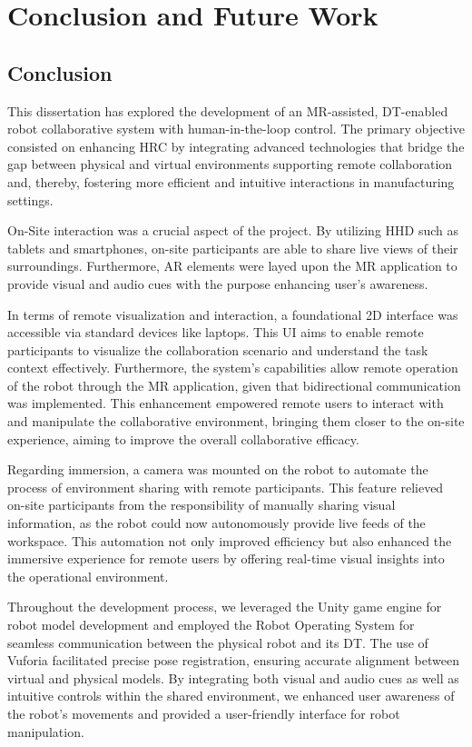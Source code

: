 \chapter{Conclusion and Future Work}%

\section{Conclusion}

This dissertation has explored the development of an \ac{MR}-assisted, \ac{DT}-enabled robot collaborative system with human-in-the-loop control. The primary objective consisted on enhancing \ac{HRC} by integrating advanced technologies that bridge the gap between physical and virtual environments supporting remote collaboration and, thereby, fostering more efficient and intuitive interactions in manufacturing settings.

On-Site interaction was a crucial aspect of the project. By utilizing \ac{HHD} such as tablets and smartphones, on-site participants are able to share live views of their surroundings. Furthermore, \ac{AR} elements were layed upon the \ac{MR} application to provide visual and audio cues with the purpose enhancing user's awareness. 

In terms of remote visualization and interaction, a foundational 2D interface was accessible via standard devices like laptops. This \ac{UI} aims to enable remote participants to visualize the collaboration scenario and understand the task context effectively. Furthermore, the system's capabilities allow remote operation of the robot through the \ac{MR} application, given that bidirectional communication was implemented. This enhancement empowered remote users to interact with and manipulate the collaborative environment, bringing them closer to the on-site experience, aiming to improve the overall collaborative efficacy.


Regarding immersion, a camera was mounted on the robot to automate the process of environment sharing with remote participants. This feature relieved on-site participants from the responsibility of manually sharing visual information, as the robot could now autonomously provide live feeds of the workspace. This automation not only improved efficiency but also enhanced the immersive experience for remote users by offering real-time visual insights into the operational environment.

Throughout the development process, we leveraged the Unity game engine for robot model development and employed the Robot Operating System for seamless communication between the physical robot and its \ac{DT}. The use of Vuforia facilitated precise pose registration, ensuring accurate alignment between virtual and physical models. By integrating both visual and audio cues as well as intuitive controls within the shared environment, we enhanced user awareness of the robot's movements and provided a user-friendly interface for robot manipulation.

